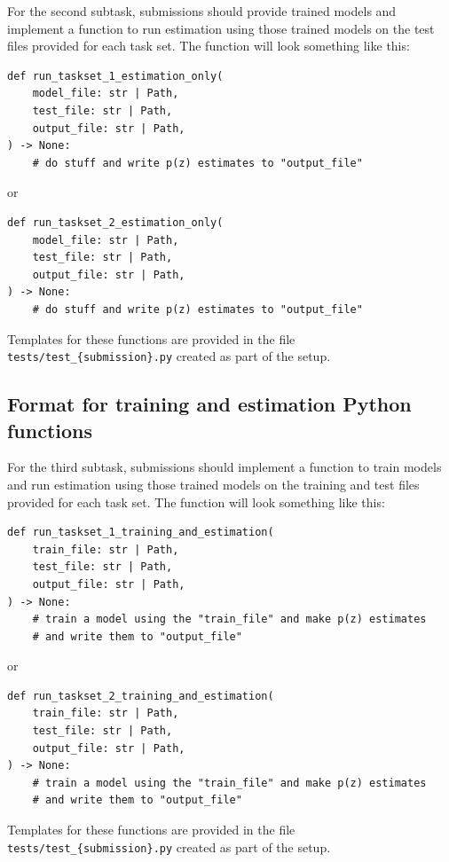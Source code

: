 \documentclass[11pt,twoside,letterpaper,onecolumn,english]{article}
\begin{document}
For the second subtask, submissions should provide trained models and
implement a function to run estimation using those trained models on
the test files provided for each task set. The function will look something like this:

\begin{verbatim}
def run_taskset_1_estimation_only(
    model_file: str | Path,
    test_file: str | Path,
    output_file: str | Path,
) -> None:
    # do stuff and write p(z) estimates to "output_file"
\end{verbatim}

or

\begin{verbatim}
def run_taskset_2_estimation_only(
    model_file: str | Path,
    test_file: str | Path,
    output_file: str | Path,
) -> None:
    # do stuff and write p(z) estimates to "output_file"
\end{verbatim}

Templates for these functions are provided in the file
\texttt{tests/test\_\{submission\}.py} created as part of the setup.


\subsection{Format for training and estimation Python functions}

For the third subtask, submissions should implement a function to
train models and run estimation using those trained models on the
training and test files provided for each task set. The function will
look something like this:

\begin{verbatim}
def run_taskset_1_training_and_estimation(
    train_file: str | Path,
    test_file: str | Path,
    output_file: str | Path,
) -> None:
    # train a model using the "train_file" and make p(z) estimates 
    # and write them to "output_file"
\end{verbatim}

or

\begin{verbatim}
def run_taskset_2_training_and_estimation(
    train_file: str | Path,
    test_file: str | Path,
    output_file: str | Path,
) -> None:
    # train a model using the "train_file" and make p(z) estimates
    # and write them to "output_file"
\end{verbatim}

Templates for these functions are provided in the file
\texttt{tests/test\_\{submission\}.py} created as part of the setup.
\end{document}
